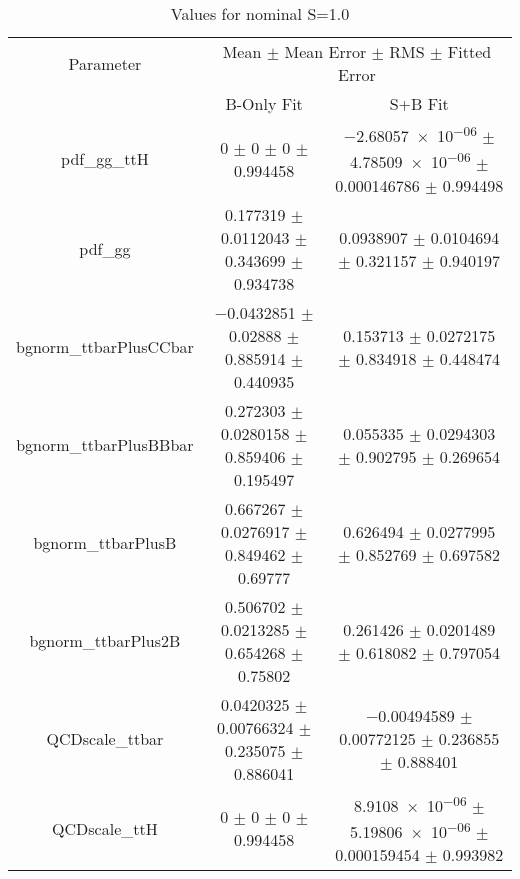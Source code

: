 \begin{table}
\centering
\caption{Values for nominal S=1.0}
\begin{tabular}{ccc}
\toprule
Parameter & \multicolumn{2}{c}{Mean $\pm$ Mean Error $\pm$ RMS $\pm$ Fitted Error}\\
 & B-Only Fit & S+B Fit\\
\midrule
pdf\_gg\_ttH & \num{0} $\pm$ \num{0} $\pm$ \num{0} $\pm$ \num{0.994458} & \num{-2.68057e-06} $\pm$ \num{4.78509e-06} $\pm$ \num{0.000146786} $\pm$ \num{0.994498}\\
pdf\_gg & \num{0.177319} $\pm$ \num{0.0112043} $\pm$ \num{0.343699} $\pm$ \num{0.934738} & \num{0.0938907} $\pm$ \num{0.0104694} $\pm$ \num{0.321157} $\pm$ \num{0.940197}\\
bgnorm\_ttbarPlusCCbar & \num{-0.0432851} $\pm$ \num{0.02888} $\pm$ \num{0.885914} $\pm$ \num{0.440935} & \num{0.153713} $\pm$ \num{0.0272175} $\pm$ \num{0.834918} $\pm$ \num{0.448474}\\
bgnorm\_ttbarPlusBBbar & \num{0.272303} $\pm$ \num{0.0280158} $\pm$ \num{0.859406} $\pm$ \num{0.195497} & \num{0.055335} $\pm$ \num{0.0294303} $\pm$ \num{0.902795} $\pm$ \num{0.269654}\\
bgnorm\_ttbarPlusB & \num{0.667267} $\pm$ \num{0.0276917} $\pm$ \num{0.849462} $\pm$ \num{0.69777} & \num{0.626494} $\pm$ \num{0.0277995} $\pm$ \num{0.852769} $\pm$ \num{0.697582}\\
bgnorm\_ttbarPlus2B & \num{0.506702} $\pm$ \num{0.0213285} $\pm$ \num{0.654268} $\pm$ \num{0.75802} & \num{0.261426} $\pm$ \num{0.0201489} $\pm$ \num{0.618082} $\pm$ \num{0.797054}\\
QCDscale\_ttbar & \num{0.0420325} $\pm$ \num{0.00766324} $\pm$ \num{0.235075} $\pm$ \num{0.886041} & \num{-0.00494589} $\pm$ \num{0.00772125} $\pm$ \num{0.236855} $\pm$ \num{0.888401}\\
QCDscale\_ttH & \num{0} $\pm$ \num{0} $\pm$ \num{0} $\pm$ \num{0.994458} & \num{8.9108e-06} $\pm$ \num{5.19806e-06} $\pm$ \num{0.000159454} $\pm$ \num{0.993982}\\
\bottomrule
\end{tabular}
\end{table}